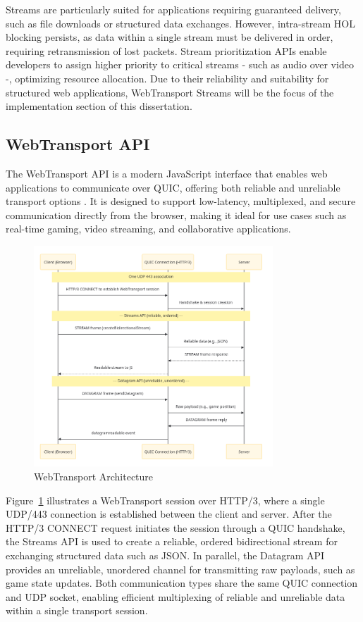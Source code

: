 Streams are particularly suited for applications requiring guaranteed delivery, such as file downloads or structured data exchanges. However, intra-stream HOL blocking persists, as data within a single stream must be delivered in order, requiring retransmission of lost packets. Stream prioritization APIs enable developers to assign higher priority to critical streams - such as audio over video -, optimizing resource allocation. Due to their reliability and suitability for structured web applications, WebTransport Streams will be the focus of the implementation section of this dissertation.

\subsection{WebTransport API}

The WebTransport API is a modern JavaScript interface that enables web applications to communicate over QUIC, offering both reliable and unreliable transport options \cite{webtransport-mdn}. It is designed to support low-latency, multiplexed, and secure communication directly from the browser, making it ideal for use cases such as real-time gaming, video streaming, and collaborative applications.


\begin{figure}[H]
\centering
\includegraphics[width=0.8\textwidth]{SOA/webtransport_architecture.png}
\caption{WebTransport Architecture}
\label{fig:webtransport_architecture}
\end{figure}

Figure~\ref{fig:webtransport_architecture} illustrates a WebTransport session over HTTP/3, where a single UDP/443 connection is established between the client and server. After the HTTP/3 CONNECT request initiates the session through a QUIC handshake, the Streams API is used to create a reliable, ordered bidirectional stream for exchanging structured data such as JSON. In parallel, the Datagram API provides an unreliable, unordered channel for transmitting raw payloads, such as game state updates. Both communication types share the same QUIC connection and UDP socket, enabling efficient multiplexing of reliable and unreliable data within a single transport session.

